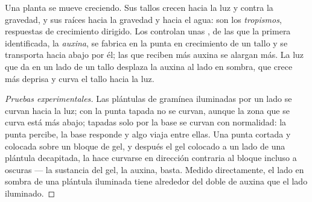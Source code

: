 \begin{proposition}\label{prop:g12:plant-rooted-life:tropisms}
Una planta se mueve creciendo. Sus tallos crecen hacia la luz y contra
la gravedad, y sus raíces hacia la gravedad y hacia el agua: son los
\emph{tropismos}, respuestas de crecimiento dirigido.
Los controlan unas , de las que la primera identificada, la
\emph{auxina}, se fabrica en la punta en crecimiento de un tallo y se
transporta hacia abajo por él; las  que reciben más auxina se
alargan más. La luz que da en un lado de un tallo desplaza la auxina al
lado en sombra, que crece más deprisa y curva el tallo hacia la luz.
\end{proposition}
\begin{proof}[Pruebas experimentales]
Las plántulas de gramínea iluminadas por un lado se curvan hacia la
luz; con la punta tapada no se curvan, aunque la zona que se curva
está más abajo; tapadas solo por la base se curvan con normalidad: la
punta percibe, la base responde y algo viaja entre ellas. Una punta
cortada y colocada sobre un bloque de gel, y después el gel colocado a
un lado de una plántula decapitada, la hace curvarse en dirección
contraria al bloque incluso a oscuras --- la sustancia del gel, la
auxina, basta. Medido directamente, el lado en sombra de una plántula
iluminada tiene alrededor del doble de auxina que el lado iluminado.
\end{proof}

